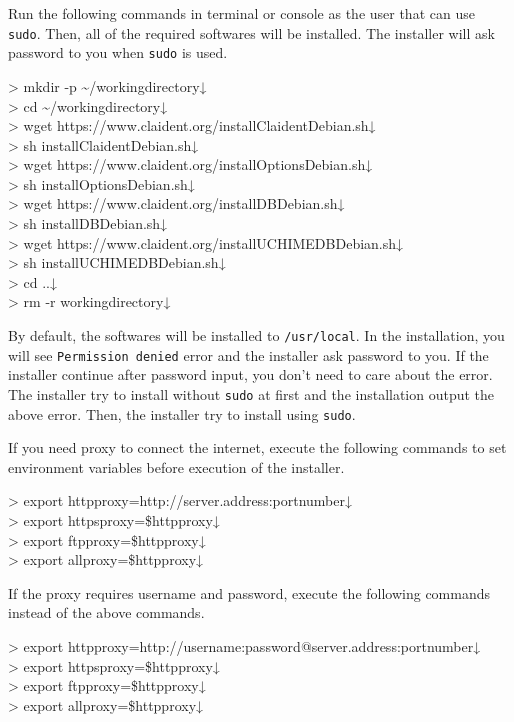 \documentclass[titlepage,10pt,a4paper,english]{jsbook}
\newenvironment{cmd}{\begin{oframed}\raggedright\ttfamily\footnotesize\setlength{\baselineskip}{1.4em}}{\end{oframed}\vspace{-1em}}
\begin{document}
Run the following commands in terminal or console as the user that can use \texttt{sudo}.
Then, all of the required softwares will be installed.
The installer will ask password to you when \texttt{sudo} is used.
\begin{cmd}
{\textgreater} mkdir -p {\textasciitilde}/workingdirectory↓\\
{\textgreater} cd {\textasciitilde}/workingdirectory↓\\
{\textgreater} wget https://www.claident.org/installClaident{\textunderscore}Debian.sh↓\\
{\textgreater} sh installClaident{\textunderscore}Debian.sh↓\\
{\textgreater} wget https://www.claident.org/installOptions{\textunderscore}Debian.sh↓\\
{\textgreater} sh installOptions{\textunderscore}Debian.sh↓\\
{\textgreater} wget https://www.claident.org/installDB{\textunderscore}Debian.sh↓\\
{\textgreater} sh installDB{\textunderscore}Debian.sh↓\\
{\textgreater} wget https://www.claident.org/installUCHIMEDB{\textunderscore}Debian.sh↓\\
{\textgreater} sh installUCHIMEDB{\textunderscore}Debian.sh↓\\
{\textgreater} cd ..↓\\
{\textgreater} rm -r workingdirectory↓
\end{cmd}
By default, the softwares will be installed to \texttt{/usr/local}.
In the installation, you will see \texttt{Permission denied} error and the installer ask password to you.
If the installer continue after password input, you don't need to care about the error.
The installer try to install without \texttt{sudo} at first and the installation output the above error.
Then, the installer try to install using \texttt{sudo}.

If you need proxy to connect the internet, execute the following commands to set environment variables before execution of the installer.
\begin{cmd}
{\textgreater} export http{\textunderscore}proxy=http://server.address:portnumber↓\\
{\textgreater} export https{\textunderscore}proxy=\$http{\textunderscore}proxy↓\\
{\textgreater} export ftp{\textunderscore}proxy=\$http{\textunderscore}proxy↓\\
{\textgreater} export all{\textunderscore}proxy=\$http{\textunderscore}proxy↓
\end{cmd}
If the proxy requires username and password, execute the following commands instead of the above commands.
\begin{cmd}
{\textgreater} export http{\textunderscore}proxy=http://username:password@server.address:portnumber↓\\
{\textgreater} export https{\textunderscore}proxy=\$http{\textunderscore}proxy↓\\
{\textgreater} export ftp{\textunderscore}proxy=\$http{\textunderscore}proxy↓\\
{\textgreater} export all{\textunderscore}proxy=\$http{\textunderscore}proxy↓
\end{cmd}
\end{document}
